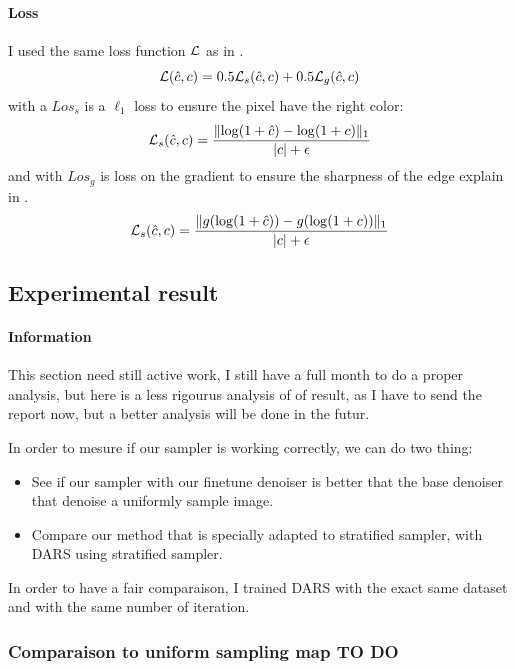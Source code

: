 \documentclass{classeENS}
\begin{document}
\paragraph*{Loss} I used the same loss function $\mathcal L$ as in \cite{kuznetsov2018deep}.
\begin{equation}
    \label{eq:6}
    \mathcal L(\hat c,c) = 0.5\mathcal L_s(\hat c,c) + 0.5\mathcal L_g(\hat c,c) 
\end{equation}
with a $Los_s$ is a $\ell_1$ loss to ensure the pixel have the right color:
\begin{equation}
    \label{eq:7}
    \mathcal L_s(\hat c,c) = \frac{\lVert \log(1+\hat c) - \log(1+c) \rVert_1}{|c| + \epsilon}
\end{equation}
and with $Los_g$ is loss on the gradient to ensure the sharpness of the edge explain in \cite{5617283}.
\begin{equation}
    \label{eq:8}
    \mathcal L_s(\hat c,c) = \frac{\lVert g(\log(1+\hat c)) - g(\log(1+c)) \rVert_1}{|c| + \epsilon}
\end{equation}

\subsection{Experimental result}

\paragraph*{Information} This section need still active work, 
I still have a full month to do a proper analysis, but
here is a less rigourus analysis of of result, as I have to send 
the report now, but a better analysis will be done in the futur.

In order to mesure if our sampler is working correctly, we can do two thing:
\begin{itemize}
    \item See if our sampler with our finetune denoiser is better that the base denoiser 
    that denoise a uniformly sample image.
    \item Compare our method that is specially adapted to stratified sampler, with DARS using stratified
    sampler. 
\end{itemize}
In order to have a fair comparaison, I trained DARS with the exact same dataset and with the same 
number of iteration.



\subsubsection{Comparaison to uniform sampling map {\color{red} TO DO}}
\end{document}

